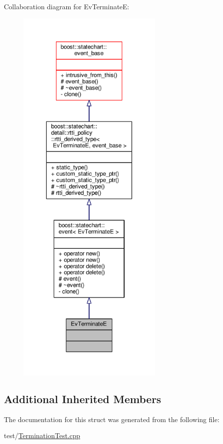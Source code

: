 Collaboration diagram for Ev\+TerminateE\+:
\nopagebreak
\begin{figure}[H]
\begin{center}
\leavevmode
\includegraphics[height=550pt]{struct_ev_terminate_e__coll__graph}
\end{center}
\end{figure}
\subsection*{Additional Inherited Members}


The documentation for this struct was generated from the following file\+:\begin{DoxyCompactItemize}
\item 
test/\mbox{\hyperlink{_termination_test_8cpp}{Termination\+Test.\+cpp}}\end{DoxyCompactItemize}
